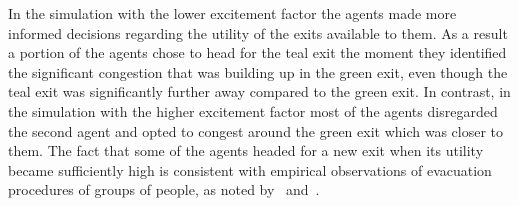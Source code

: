 In the simulation with the lower excitement factor the agents made more informed decisions regarding the utility of the exits available to them. As a result a portion of the agents chose to head for the teal exit the moment they identified the significant congestion that was building up in the green exit, even though the teal exit was significantly further away compared to the green exit. In contrast, in the simulation with the higher excitement factor most of the agents disregarded the second agent and opted to congest around the green exit which was closer to them. The fact that some of the agents headed for a new exit when its utility became sufficiently high is consistent with empirical observations of evacuation procedures of groups of people, as noted by~\citet{Helbing1997} and~\citet{Seneviratne1985}.
